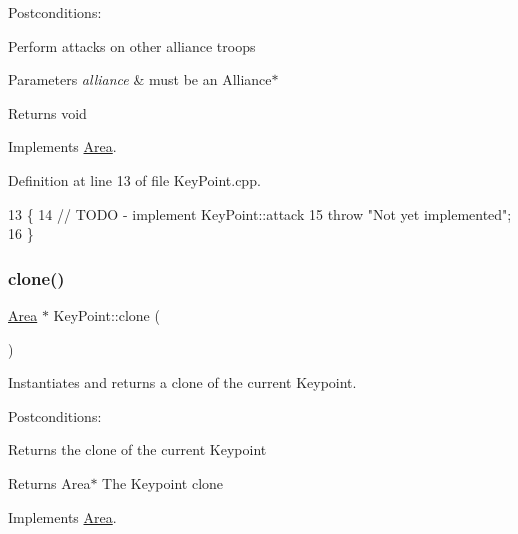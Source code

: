 Postconditions\+:
\begin{DoxyItemize}
\item Perform attacks on other alliance troops
\end{DoxyItemize}


\begin{DoxyParams}{Parameters}
{\em alliance} & must be an Alliance$\ast$ \\
\hline
\end{DoxyParams}
\begin{DoxyReturn}{Returns}
void 
\end{DoxyReturn}


Implements \hyperlink{classArea}{Area}.



Definition at line 13 of file Key\+Point.\+cpp.


\begin{DoxyCode}
13                                         \{
14     \textcolor{comment}{// TODO - implement KeyPoint::attack}
15     \textcolor{keywordflow}{throw} \textcolor{stringliteral}{"Not yet implemented"};
16 \}
\end{DoxyCode}
\mbox{\label{classKeyPoint_adc4679ca31d34b0ae3fedded47e27938}} 
\subsubsection{\texorpdfstring{clone()}{clone()}}
{\footnotesize\ttfamily \hyperlink{classArea}{Area} $\ast$ Key\+Point\+::clone (\begin{DoxyParamCaption}{ }\end{DoxyParamCaption})\hspace{0.3cm}{\ttfamily [virtual]}}



Instantiates and returns a clone of the current Keypoint. 

Postconditions\+:
\begin{DoxyItemize}
\item Returns the clone of the current Keypoint
\end{DoxyItemize}

\begin{DoxyReturn}{Returns}
Area$\ast$ The Keypoint clone 
\end{DoxyReturn}


Implements \hyperlink{classArea}{Area}.



